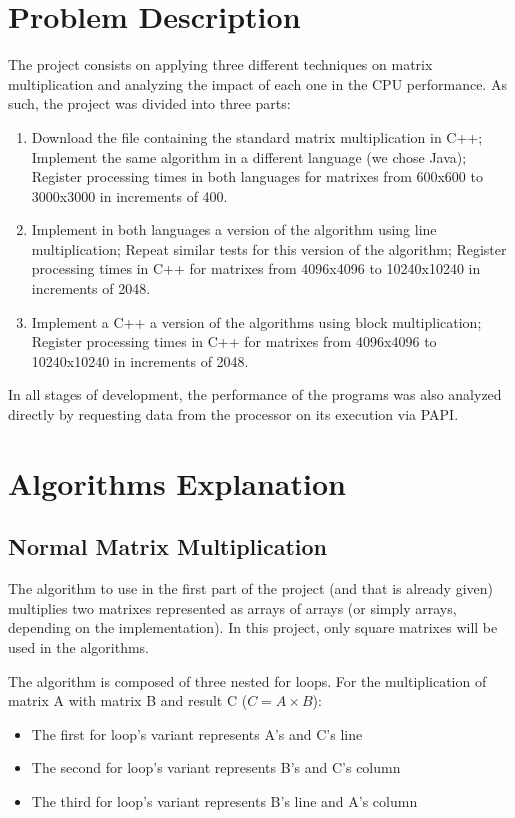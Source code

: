 \section{Problem Description}

The project consists on applying three different techniques on matrix multiplication and analyzing the impact of each one in the CPU performance. As such, the project was divided into three parts:

\begin{enumerate}
    \item Download the file containing the standard matrix multiplication in C++; Implement the same algorithm in a different language (we chose Java); Register processing times in both languages for matrixes from 600x600 to 3000x3000 in increments of 400.
    \item Implement in both languages a version of the algorithm using line multiplication; Repeat similar tests for this version of the algorithm; Register processing times in C++ for matrixes from 4096x4096 to 10240x10240 in increments of 2048.
    \item Implement a C++ a version of the algorithms using block multiplication; Register processing times in C++ for matrixes from 4096x4096 to 10240x10240 in increments of 2048.
\end{enumerate}

In all stages of development, the performance of the programs was also analyzed directly by requesting data from the processor on its execution via PAPI.

\section{Algorithms Explanation}

\subsection{Normal Matrix Multiplication}
The algorithm to use in the first part of the project (and that is already given) multiplies two matrixes represented as arrays of arrays (or simply arrays, depending on the implementation). In this project, only square matrixes will be used in the algorithms. 

The algorithm is composed of three nested for loops. 
For the multiplication of matrix A with matrix B and result C ($C = A \times B$):

\begin{itemize}
    \item The first for loop's variant represents A's and C's line
    \item The second for loop's variant represents B's and C's column
    \item The third for loop's variant represents B's line and A's column
\end{itemize}

